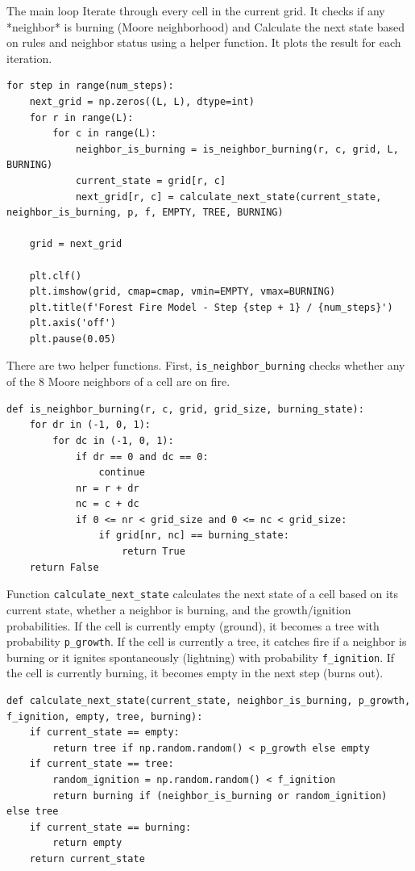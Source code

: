 \documentclass{article}
\begin{document}
The main loop Iterate through every cell in the current grid. It checks if any *neighbor* is burning (Moore neighborhood) and Calculate the next state based on rules and neighbor status using a helper function. It plots the result for each iteration.
\begin{lstlisting}[caption={Main code}]
for step in range(num_steps):
    next_grid = np.zeros((L, L), dtype=int)
    for r in range(L):
        for c in range(L):
            neighbor_is_burning = is_neighbor_burning(r, c, grid, L, BURNING)
            current_state = grid[r, c]
            next_grid[r, c] = calculate_next_state(current_state, neighbor_is_burning, p, f, EMPTY, TREE, BURNING)

    grid = next_grid

    plt.clf()
    plt.imshow(grid, cmap=cmap, vmin=EMPTY, vmax=BURNING)
    plt.title(f'Forest Fire Model - Step {step + 1} / {num_steps}')
    plt.axis('off')
    plt.pause(0.05)
\end{lstlisting}

There are two helper functions. First, \texttt{is\_neighbor\_burning} checks whether any of the 8 Moore neighbors of a cell are on fire. 

\begin{lstlisting}[caption={Helper functions}]
def is_neighbor_burning(r, c, grid, grid_size, burning_state):
    for dr in (-1, 0, 1):
        for dc in (-1, 0, 1):
            if dr == 0 and dc == 0:
                continue
            nr = r + dr
            nc = c + dc
            if 0 <= nr < grid_size and 0 <= nc < grid_size:
                if grid[nr, nc] == burning_state:
                    return True
    return False
\end{lstlisting}

Function \texttt{calculate\_next\_state} calculates the next state of a cell based on its current state, whether a neighbor is burning, and the growth/ignition probabilities. If the cell is currently empty (ground), it becomes a tree with probability \texttt{p\_growth}. If the cell is currently a tree, it catches fire if a neighbor is burning or it ignites spontaneously (lightning) with probability \texttt{f\_ignition}. If the cell is currently burning, it becomes empty in the next step (burns out).

\begin{lstlisting}[caption={Helper functions}]
def calculate_next_state(current_state, neighbor_is_burning, p_growth, f_ignition, empty, tree, burning):
    if current_state == empty:
        return tree if np.random.random() < p_growth else empty
    if current_state == tree:
        random_ignition = np.random.random() < f_ignition
        return burning if (neighbor_is_burning or random_ignition) else tree
    if current_state == burning:
        return empty
    return current_state
\end{lstlisting}
\end{document}
